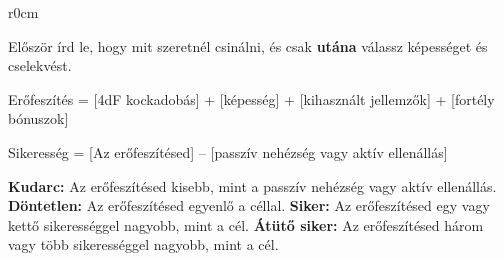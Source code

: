 {
\begin{wraptable}{r}{0cm}
\end{wraptable}


Először írd le, hogy mit szeretnél csinálni, és csak \textbf{utána} válassz képességet és cselekvést.


Erőfeszítés = [4dF kockadobás] + [képesség] + [kihasznált jellemzők] + [fortély bónuszok]


Sikeresség = [Az erőfeszítésed] -- [passzív nehézség vagy aktív ellenállás]

\begin{itemize}
    \failureitem \textbf{Kudarc:} Az erőfeszítésed kisebb, mint a passzív nehézség vagy aktív ellenállás.
    \tieitem \textbf{Döntetlen:} Az erőfeszítésed egyenlő a céllal.
    \successitem \textbf{Siker:} Az erőfeszítésed egy vagy kettő sikerességgel nagyobb, mint a cél.
    \successwithstyleitem \textbf{Átütő siker:} Az erőfeszítésed három vagy több sikerességgel nagyobb, mint a cél.
\end{itemize}
}

\vspace{5pt}

